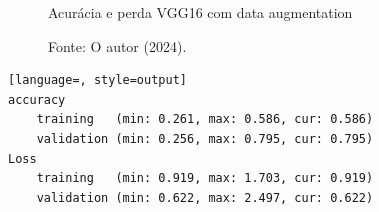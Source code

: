 \begin{figure}[h!]
\centering
\caption{Acurácia e perda VGG16 com data augmentation}
\hspace*{-2cm} %
\caption*{Fonte: O autor (2024).}
\end{figure}

\begin{lstlisting}[language=, style=output]
accuracy
	training   (min: 0.261, max: 0.586, cur: 0.586)
	validation (min: 0.256, max: 0.795, cur: 0.795)
Loss
	training   (min: 0.919, max: 1.703, cur: 0.919)
	validation (min: 0.622, max: 2.497, cur: 0.622)
\end{lstlisting}


